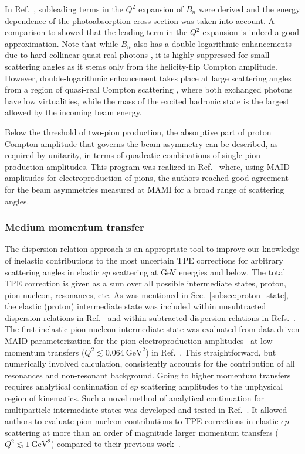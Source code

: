 In Ref.~\cite{Gorchtein:2006mq}, subleading terms in the $Q^2$ expansion of $B_n$ were derived and the energy dependence of the photoabsorption cross section was taken into account. A comparison to  showed that the leading-term in the $Q^2$ expansion is indeed a good approximation. Note that while $B_n$ also has a double-logarithmic enhancements due to hard collinear quasi-real photons \cite{Afanasev:2004pu,Afanasev:2004hp,Gorchtein:2005yz}, it is highly suppressed for small scattering angles as it stems only from the helicity-flip Compton amplitude. However, double-logarithmic enhancement takes place at large scattering angles from a region of quasi-real Compton scattering \cite{pasquini2004resonance}, where both exchanged photons have low virtualities, while the mass of the excited hadronic state is the largest allowed by the incoming beam energy. 

Below the threshold of two-pion production, the absorptive part of proton Compton amplitude that governs the beam asymmetry can be described, as required by unitarity, in terms of quadratic combinations of single-pion production amplitudes. This program was realized in Ref.~\cite{pasquini2004resonance} where, using MAID amplitudes for electroproduction of pions, the authors reached good agreement for the beam asymmetries measured at MAMI for a broad range of scattering angles.



\subsubsection{Medium momentum transfer}\label{MediumMT}


The dispersion relation approach is an appropriate tool to improve our knowledge of inelastic contributions to the most uncertain TPE corrections for arbitrary scattering angles in elastic $ep$ scattering at GeV energies and below. The total TPE correction is given as a sum over all possible intermediate states, proton, pion-nucleon, resonances, etc. As was mentioned in Sec.~\ref{subsec:proton_state}, the elastic (proton) intermediate state was included within unsubtracted dispersion relations in Ref.~\cite{Borisyuk:2006fh} and within subtracted dispersion relations in Refs.~\cite{Tomalak:2014sva,Tomalak:2018jak}. The first inelastic pion-nucleon intermediate state was evaluated from data-driven MAID parameterization for the pion electroproduction amplitudes~\cite{Drechsel:1998hk,Drechsel:2007if} at low momentum transfers ($Q^2 \lesssim 0.064~\mathrm{GeV}^2$) in Ref.~\cite{Tomalak:2016vbf}. This straightforward, but numerically involved calculation, consistently accounts for the contribution of all resonances and non-resonant background. Going to higher momentum transfers requires analytical continuation of $ep$ scattering amplitudes to the unphysical region of kinematics. Such a novel method of analytical continuation for multiparticle intermediate states was developed and tested in Ref.~\cite{Tomalak:2017shs}. It allowed authors to evaluate pion-nucleon contributions to TPE corrections in elastic $ep$ scattering at more than an order of magnitude larger momentum transfers ($Q^2 \lesssim 1~\mathrm{GeV}^2$) compared to their previous work~\cite{Tomalak:2016vbf}.

